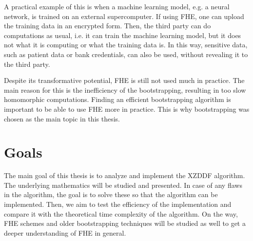 A practical example of this is when a machine learning model, e.g. a neural network, is trained on an external supercomputer. If using FHE, one can upload the training data in an encrypted form. Then, the third party can do computations as usual, i.e. it can train the machine learning model, but it does not what it is computing or what the training data is. In this way, sensitive data, such as patient data or bank credentials, can also be used, without revealing it to the third party.

Despite its transformative potential, FHE is still not used much in practice. The main reason for this is the inefficiency of the bootstrapping, resulting in too slow homomorphic computations. Finding an efficient bootstrapping algorithm is important to be able to use FHE more in practice. This is why bootstrapping was chosen as the main topic in this thesis.




\section{Goals}

The main goal of this thesis is to analyze and implement the XZDDF algorithm. The underlying mathematics will be studied and presented. In case of any flaws in the algorithm, the goal is to solve these so that the algorithm can be implemented. Then, we aim to test the efficiency of the implementation and compare it with the theoretical time complexity of the algorithm. On the way, FHE schemes and older bootstrapping techniques will be studied as well to get a deeper understanding of FHE in general.


